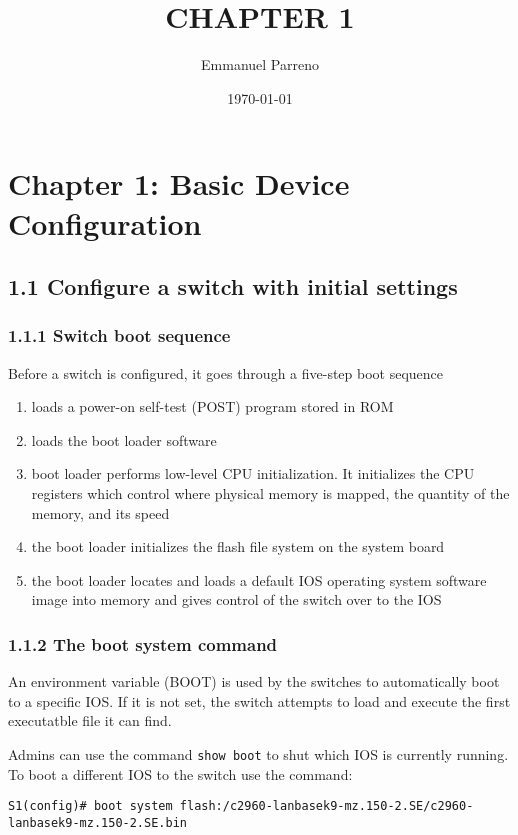 \documentclass[11pt]{article}
\author{Emmanuel Parreno}
\date{\today}
\title{CHAPTER 1}
\begin{document}
\maketitle
\tableofcontents


\section{Chapter 1: Basic Device Configuration}
\label{sec:orgbb265a6}
\subsection{1.1 Configure a switch with initial settings}
\label{sec:orgd63feea}
\subsubsection{1.1.1 Switch boot sequence}
\label{sec:orga8e8142}
Before a switch is configured, it goes through a five-step boot
sequence

\begin{enumerate}
\item loads a power-on self-test (POST) program stored in ROM
\item loads the boot loader software
\item boot loader performs low-level CPU initialization. It initializes
the CPU registers which control where physical memory is mapped,
the quantity of the memory, and its speed
\item the boot loader initializes the flash file system on the system board
\item the boot loader locates and loads a default IOS operating system
software image into memory and gives control of the switch over to
the IOS
\end{enumerate}

\subsubsection{1.1.2 The boot system command}
\label{sec:orgabd0397}
An environment variable (BOOT) is used by the switches to
automatically boot to a specific IOS. If it is not set, the switch
attempts to load and execute the first executatble file it can find.

Admins can use the command \texttt{show boot} to shut which IOS is currently
running. To boot a different IOS to the switch use the command:

\begin{verbatim}
S1(config)# boot system flash:/c2960-lanbasek9-mz.150-2.SE/c2960-lanbasek9-mz.150-2.SE.bin
\end{verbatim}
\end{document}
